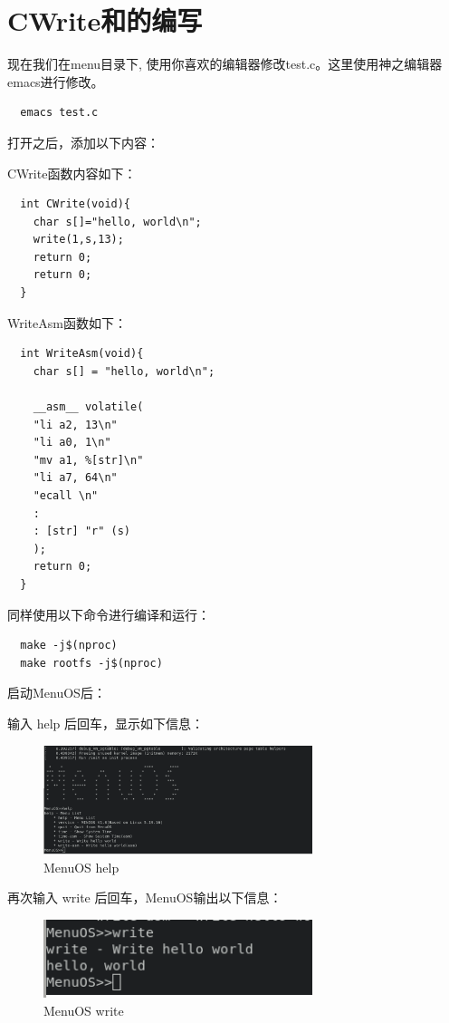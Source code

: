 \documentclass[lang=cn,10pt]{elegantbook}
\begin{document}
\section{CWrite和的编写}
现在我们在menu目录下, 使用你喜欢的编辑器修改test.c。这里使用神之编辑器emacs进行修改。

\begin{lstlisting}
  emacs test.c
\end{lstlisting}
打开之后，添加以下内容：

CWrite函数内容如下：

\begin{lstlisting}
  int CWrite(void){
    char s[]="hello, world\n";
    write(1,s,13);
    return 0;
    return 0;
  }
\end{lstlisting}

WriteAsm函数如下：


\begin{lstlisting}
  int WriteAsm(void){
    char s[] = "hello, world\n";

    __asm__ volatile(
    "li a2, 13\n"
    "li a0, 1\n"
    "mv a1, %[str]\n"
    "li a7, 64\n"
    "ecall \n"
    :
    : [str] "r" (s)
    );
    return 0;
  }
\end{lstlisting}

同样使用以下命令进行编译和运行：

\begin{lstlisting}
  make -j$(nproc)
  make rootfs -j$(nproc)
\end{lstlisting}

启动MenuOS后：

输入 help 后回车，显示如下信息：
\begin{figure}[htbp]
  \centering
  \includegraphics[width=0.7\textwidth]{image/image-20231105212850985.png}
  \caption{MenuOS help}
\end{figure}

再次输入 write 后回车，MenuOS输出以下信息：
\begin{figure}[htbp]
  \centering
  \includegraphics[width=0.7\textwidth]{image/image-20231105212959159.png}
  \caption{MenuOS write}
\end{figure}
\end{document}
